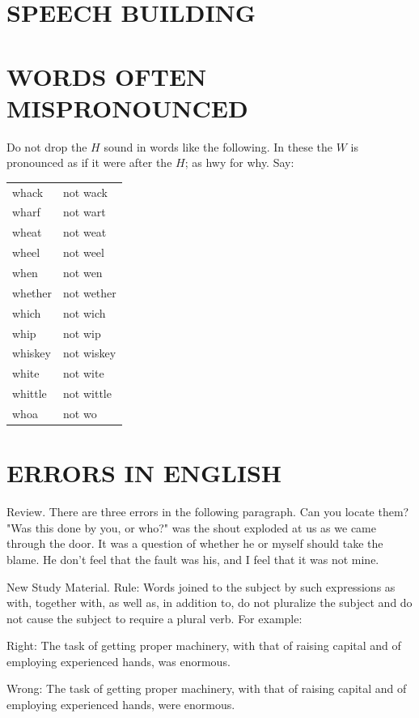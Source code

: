 \documentclass[10pt]{article}
\begin{document}
\section*{SPEECH BUILDING}
\section*{WORDS OFTEN MISPRONOUNCED}
Do not drop the $H$ sound in words like the following. In these the $W$ is pronounced as if it were after the $H$; as hwy for why. Say:

\begin{center}
\begin{tabular}{ll}
whack & not wack \\
wharf & not wart \\
wheat & not weat \\
wheel & not weel \\
when & not wen \\
whether & not wether \\
which & not wich \\
whip & not wip \\
whiskey & not wiskey \\
white & not wite \\
whittle & not wittle \\
whoa & not wo \\
\end{tabular}
\end{center}

\section*{ERRORS IN ENGLISH}
Review. There are three errors in the following paragraph. Can you locate them?\\
"Was this done by you, or who?" was the shout exploded at us as we came through the door. It was a question of whether he or myself should take the blame. He don't feel that the fault was his, and I feel that it was not mine.

New Study Material. Rule: Words joined to the subject by such expressions as with, together with, as well as, in addition to, do not pluralize the subject and do not cause the subject to require a plural verb. For example:

Right: The task of getting proper machinery, with that of raising capital and of employing experienced hands, was enormous.

Wrong: The task of getting proper machinery, with that of raising capital and of employing experienced hands, were enormous.
\end{document}
